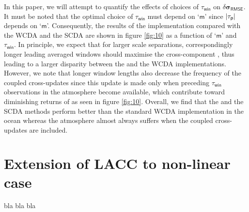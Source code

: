 \documentclass[a4paper,10pt]{article}
\begin{document}
\begin{multicols}{2}
\begin{figure}[H]
\label{fig:11}
\end{figure}
{\noindent}In this paper, we will attempt to quantify the effects of choices of $\tau_\mathsf{win}$ on $\delta\boldsymbol{\sigma}_\mathsf{RMSE}$. It must be noted that the optimal choice of $\tau_\mathsf{win}$ must depend on `$\mathsf{m}$' since $|\tau_\mathsf{p}|$ depends on `$\mathsf{m}$'. Consequently, the results of the {\lacc} implementation compared with the \textsf{WCDA} and the \textsf{SCDA} are shown in figure \ref{fig:10} as a function of `$\mathsf{m}$' and $\tau_\mathsf{win}$. In principle, we expect that for larger scale separations, correspondingly longer leading averaged windows should maximise the cross-component {\snr}, thus leading to a larger disparity between the {\lacc} and the \textsf{WCDA} implementations. However, we note that longer window lengths also decrease the frequency of the coupled cross-updates since this update is made only when preceding $\tau_\mathsf{win}$ observations in the atmosphere become available, which contribute toward diminishing returns of {\lacc} as seen in figure \ref{fig:10}. Overall, we find that the {\lacc} and the \textsf{SCDA} methods perform better than the standard \textsf{WCDA} implementation in the ocean whereas the atmosphere almost always suffers when the coupled cross-updates are included. 
\section{Extension of LACC to non-linear case}
\textsf{bla bla bla}
\label{sec:nonlinear}


\end{multicols}
\end{document}
